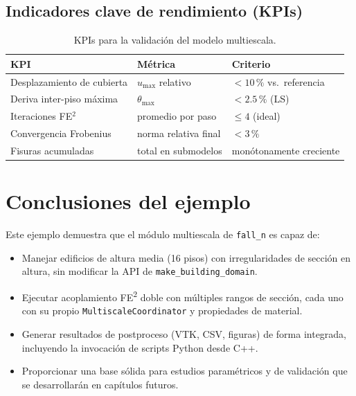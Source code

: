 \subsection{Indicadores clave de rendimiento (KPIs)}

\begin{table}[htbp]
  \centering
  \caption{KPIs para la validación del modelo multiescala.}
  \label{tab:ms16-kpi}
  \begin{tabular}{lll}
    \toprule
    KPI & Métrica & Criterio \\
    \midrule
    Desplazamiento de cubierta & $u_{\max}$ relativo & $<10\,\%$ vs.\ referencia \\
    Deriva inter-piso máxima & $\theta_{\max}$ & $<2{.}5\,\%$ (LS) \\
    Iteraciones FE$^2$ & promedio por paso & $\leq 4$ (ideal) \\
    Convergencia Frobenius & norma relativa final & $<3\,\%$ \\
    Fisuras acumuladas & total en submodelos & monótonamente creciente \\
    \bottomrule
  \end{tabular}
\end{table}


\section{Conclusiones del ejemplo}
\label{sec:ms16-conclusions}

Este ejemplo demuestra que el módulo multiescala de \texttt{fall\_n}
es capaz de:
\begin{itemize}
  \item Manejar edificios de altura media (16 pisos) con
        irregularidades de sección en altu\-ra, sin modificar la API
        de \texttt{make\_building\_domain}.
  \item Ejecutar acoplamiento FE\textsuperscript{2} doble con
        múltiples rangos de sección, cada uno con su propio
        \texttt{MultiscaleCoordinator} y propiedades de material.
  \item Generar resultados de postproceso (VTK, CSV, figuras)
        de forma integrada, incluyendo la invocación de scripts
        Python desde C++.
  \item Proporcionar una base sólida para estudios paramétricos y
        de validación que se desarrollarán en capítulos futuros.
\end{itemize}
